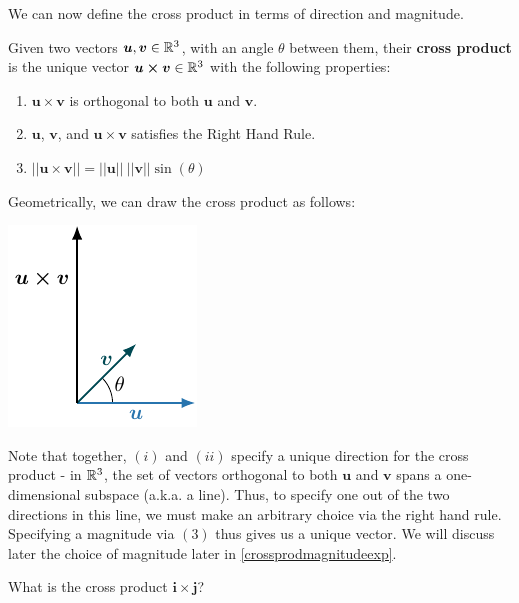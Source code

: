 We can now define the cross product in terms of direction and magnitude.

\begin{definition}\label{crossproddirmag}
    Given two vectors $\bm{u}, \bm{v} \in \mathbb{R}^3$, with an angle $\theta$ between them, their \textbf{cross product} is the \textnormal{unique} vector $\bm{u \times v} \in \mathbb{R}^3$ with the following properties:
    \begin{enumerate}[label=(\roman*)]
        \item $\bm{u \times v}$ is orthogonal to both $\bm{u}$ and $\bm{v}$.
        \item $\bm{u}$, $\bm{v}$, and $\bm{u \times v}$ satisfies the Right Hand Rule. 
        \item $||\bm{u \times v}|| = ||\bm{u}|| \ ||\bm{v}|| \sin(\theta)$
    \end{enumerate}
    
    Geometrically, we can draw the cross product as follows:
    
    
 \begin{center}        
        \includegraphics{chapters/1-LinearAlgebra/figures/figures-crossproduct.pdf}
    \end{center}
    
    \end{definition}



Note that together, $(i)$ and $(ii)$ specify a unique direction for the cross product - in $\mathbb{R}^3$, the set of vectors orthogonal to both $\bm{u}$ and $\bm{v}$ spans a one-dimensional subspace (a.k.a. a line).  Thus, to specify one out of the two directions in this line, we must make an arbitrary choice via the right hand rule.  Specifying a magnitude via $(3)$ thus gives us a unique vector.  We will discuss later the choice of magnitude later in \ref{crossprodmagnitudeexp}.

\begin{example}
    What is the cross product $\bm{i} \times \bm{j}$?
\end{example}

